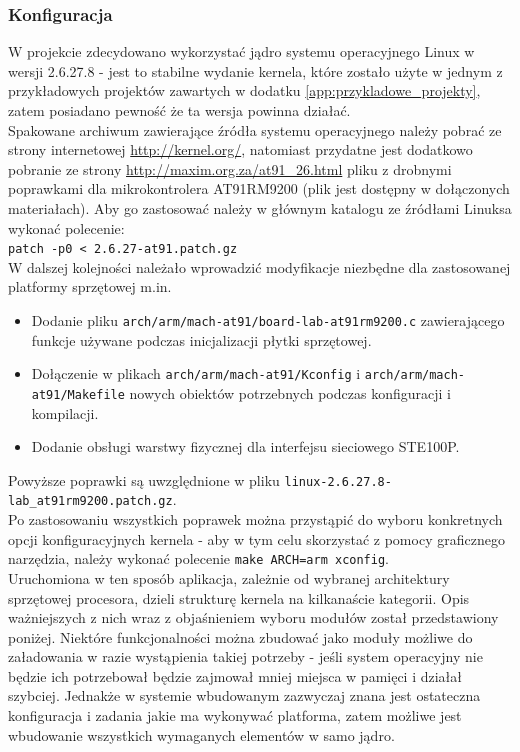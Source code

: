 \documentclass[a4paper,12pt]{book}
\begin{document}
				\subsubsection{Konfiguracja}
					W projekcie zdecydowano wykorzystać jądro systemu operacyjnego Linux w wersji 2.6.27.8 - jest to stabilne wydanie kernela, które zostało użyte w jednym z przykładowych projektów zawartych w dodatku \ref{app:przykladowe_projekty}, zatem posiadano pewność że ta wersja powinna działać.\\
					Spakowane archiwum zawierające źródła systemu operacyjnego należy pobrać ze strony internetowej \url{http://kernel.org/}, natomiast przydatne jest dodatkowo pobranie ze strony \url{http://maxim.org.za/at91_26.html} pliku z drobnymi poprawkami dla mikrokontrolera AT91RM9200 (plik jest dostępny w dołączonych materiałach). Aby go zastosować należy w głównym katalogu ze źródłami Linuksa wykonać polecenie:\\
					\texttt{patch -p0 < 2.6.27-at91.patch.gz}\\
					W dalszej kolejności należało wprowadzić modyfikacje niezbędne dla zastosowanej platformy sprzętowej m.in.
					\begin{itemize}
						\item Dodanie pliku \texttt{arch/arm/mach-at91/board-lab-at91rm9200.c} zawierającego funkcje używane podczas inicjalizacji płytki sprzętowej.
						\item Dołączenie w plikach \texttt{arch/arm/mach-at91/Kconfig} i \texttt{arch/arm/mach-at91/Makefile} nowych obiektów potrzebnych podczas konfiguracji i kompilacji.
						\item Dodanie obsługi warstwy fizycznej dla interfejsu sieciowego STE100P.
					\end{itemize}
					Powyższe poprawki są uwzględnione w pliku \texttt{linux-2.6.27.8-lab\_at91rm9200.patch.gz}.\\
					Po zastosowaniu wszystkich poprawek można przystąpić do wyboru konkretnych opcji konfiguracyjnych kernela - aby w tym celu skorzystać z pomocy graficznego narzędzia, należy wykonać polecenie \texttt{make ARCH=arm xconfig}.\\
					Uruchomiona w ten sposób aplikacja, zależnie od wybranej architektury sprzętowej procesora, dzieli strukturę kernela na kilkanaście kategorii. Opis ważniejszych z nich wraz z objaśnieniem wyboru modułów został przedstawiony poniżej. Niektóre funkcjonalności można zbudować jako moduły możliwe do załadowania w razie wystąpienia takiej potrzeby - jeśli system operacyjny nie będzie ich potrzebował będzie zajmował mniej miejsca w pamięci i działał szybciej. Jednakże w systemie wbudowanym zazwyczaj znana jest ostateczna konfiguracja i zadania jakie ma wykonywać platforma, zatem możliwe jest wbudowanie wszystkich wymaganych elementów w samo jądro.
\end{document}
